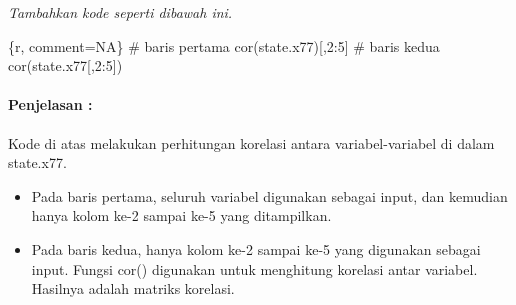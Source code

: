 \documentclass[
]{article}
\begin{document}
\emph{Tambahkan kode seperti dibawah ini.}

\{r, comment=NA\} \# baris pertama cor(state.x77){[},2:5{]} \# baris
kedua cor(state.x77{[},2:5{]})

\hypertarget{penjelasan-1}{%
\paragraph{Penjelasan :}\label{penjelasan-1}}

Kode di atas melakukan perhitungan korelasi antara variabel-variabel di
dalam state.x77.

\begin{itemize}
\item
  Pada baris pertama, seluruh variabel digunakan sebagai input, dan
  kemudian hanya kolom ke-2 sampai ke-5 yang ditampilkan.
\item
  Pada baris kedua, hanya kolom ke-2 sampai ke-5 yang digunakan sebagai
  input. Fungsi cor() digunakan untuk menghitung korelasi antar
  variabel. Hasilnya adalah matriks korelasi.
\end{itemize}
\end{document}
